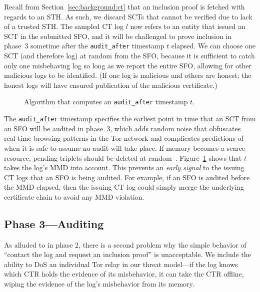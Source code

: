 Recall from Section~\ref{sec:background:ct} that an inclusion proof is fetched
with regards to an STH\@.  As such, we discard SCTs that cannot be verified due
to lack of a trusted STH\@.  The sampled CT log $l$ now refers to an entity that
issued an SCT in the submitted SFO, and it will be challenged to prove inclusion
in phase~3 sometime after the \texttt{audit\_after} timestamp $t$ elapsed. We
can choose one SCT (and therefore log) at random from the SFO, because it is
sufficient to catch only one misbehaving log so long as we report the entire
SFO, allowing for other malicious logs to be identified. (If one log is
malicious and others are honest; the honest logs will have ensured publication
of the malicious certificate.)

\begin{figure}
	\centering
	\caption{%
		Algorithm that computes an \texttt{audit\_after} timestamp $t$.
	}
	\label{fig:audit-after}
\end{figure}

The \texttt{audit\_after} timestamp specifies the earliest point in time that an
SCT from an SFO will be audited in phase~3, which adds random noise that
obfuscates real-time browsing patterns in the Tor network and complicates
predictions of when it is safe to assume no audit will take place.  If memory
becomes a scarce resource, pending triplets should be deleted at
random~\cite{nordberg}. Figure~\ref{fig:audit-after} shows that $t$ takes the
log's MMD into account.  This prevents an \emph{early signal} to the issuing CT
logs that an SFO is being audited.  For example, if an SFO is audited before the
MMD elapsed, then the issuing CT log could simply merge the underlying
certificate chain to avoid any MMD violation.

\subsection{Phase 3---Auditing} \label{sec:base:phase3}

As alluded to in phase 2, there is a second problem why the simple behavior of
``contact the log and request an inclusion proof'' is unacceptable. We include
the ability to DoS an individual Tor relay in our threat model---if the log
knows which CTR holds the evidence of its misbehavior, it can take the CTR
offline, wiping the evidence of the log's misbehavior from its memory. 

